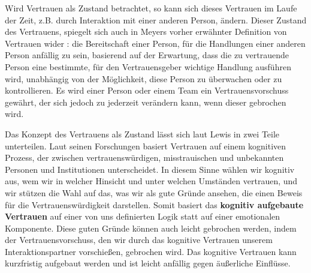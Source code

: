 \documentclass[a4paper,11pt]{article}%
\renewcommand{\\}{\vspace*{0.5\baselineskip} \newline}
\begin{document}
Wird Vertrauen als \dq{}Zustand\dq{} betrachtet, so kann sich dieses Vertrauen im Laufe der Zeit, z.B. durch Interaktion mit einer anderen Person, ändern. Dieser \dq Zustand\dq{} des Vertrauens, spiegelt sich auch in Meyers \citep[p.712]{mayer1995integrative} vorher erwähnter Definition von Vertrauen wider :\\ \dq die Bereitschaft einer Person, für die Handlungen einer anderen Person anfällig zu sein, basierend auf der Erwartung, dass die zu vertrauende Person eine bestimmte, für den Vertrauensgeber wichtige Handlung ausführen wird, unabhängig von der Möglichkeit, diese Person zu überwachen oder zu kontrollieren.\dq{} \\
Es wird einer Person oder einem Team ein Vertrauensvorschuss gewährt, der sich jedoch zu jederzeit verändern kann, wenn dieser gebrochen wird.


Das Konzept des Vertrauens als Zustand lässt sich laut Lewis \citep[p.970-971]{lewis1985trust} in zwei Teile unterteilen.\newline
Laut seinen Forschungen basiert Vertrauen \dq auf einem kognitiven Prozess, der zwischen vertrauenswürdigen, misstrauischen und unbekannten Personen und Institutionen unterscheidet. In diesem Sinne wählen wir kognitiv aus, wem wir in welcher Hinsicht und unter welchen Umständen vertrauen, und wir stützen die Wahl auf das, was wir als \dq gute Gründe\dq{} ansehen, die einen Beweis für die Vertrauenswürdigkeit darstellen.\dq{}\citep[p.970]{lewis1985trust}
Somit basiert das \textbf{kognitiv aufgebaute Vertrauen} auf einer von uns definierten Logik statt auf einer emotionalen Komponente. Diese \dq{}guten Gründe\dq{} können auch leicht gebrochen werden, indem der Vertrauensvorschuss, den wir durch das kognitive Vertrauen unserem Interaktionspartner vorschießen, gebrochen wird.
Das kognitive Vertrauen kann kurzfristig aufgebaut werden und ist leicht anfällig gegen äußerliche Einflüsse. 
\end{document}
